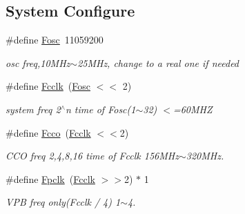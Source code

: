 \subsection*{System Configure}
\begin{DoxyCompactItemize}
\item 
\mbox{\label{group__RTEMSBSPsARMRTL22XX_gae9bb9fae1c140030037aa1eaa9470b74}} 
\#define \mbox{\hyperlink{group__RTEMSBSPsARMRTL22XX_gae9bb9fae1c140030037aa1eaa9470b74}{Fosc}}~11059200
\begin{DoxyCompactList}\small\item\em osc freq,10M\+Hz$\sim$25\+M\+Hz, change to a real one if needed \end{DoxyCompactList}\item 
\mbox{\label{group__RTEMSBSPsARMRTL22XX_ga66baa07b976e8410ffd4ba3d3d2bd8b5}} 
\#define \mbox{\hyperlink{group__RTEMSBSPsARMRTL22XX_ga66baa07b976e8410ffd4ba3d3d2bd8b5}{Fcclk}}~(\mbox{\hyperlink{group__RTEMSBSPsARMRTL22XX_gae9bb9fae1c140030037aa1eaa9470b74}{Fosc}} $<$$<$ 2)
\begin{DoxyCompactList}\small\item\em system freq 2$^\wedge$n time of Fosc(1$\sim$32) $<$=60M\+HZ \end{DoxyCompactList}\item 
\mbox{\label{group__RTEMSBSPsARMRTL22XX_ga460866a2dcef5ba8998a3db2a3c59e56}} 
\#define \mbox{\hyperlink{group__RTEMSBSPsARMRTL22XX_ga460866a2dcef5ba8998a3db2a3c59e56}{Fcco}}~(\mbox{\hyperlink{group__RTEMSBSPsARMRTL22XX_ga66baa07b976e8410ffd4ba3d3d2bd8b5}{Fcclk}} $<$$<$2)
\begin{DoxyCompactList}\small\item\em C\+CO freq 2,4,8,16 time of Fcclk 156M\+Hz$\sim$320\+M\+Hz. \end{DoxyCompactList}\item 
\mbox{\label{group__RTEMSBSPsARMRTL22XX_ga2dfa997b5d9c757ba0f8015b9e29a34b}} 
\#define \mbox{\hyperlink{group__RTEMSBSPsARMRTL22XX_ga2dfa997b5d9c757ba0f8015b9e29a34b}{Fpclk}}~(\mbox{\hyperlink{group__RTEMSBSPsARMRTL22XX_ga66baa07b976e8410ffd4ba3d3d2bd8b5}{Fcclk}} $>$$>$2) $\ast$ 1
\begin{DoxyCompactList}\small\item\em V\+PB freq only(Fcclk / 4) 1$\sim$4. \end{DoxyCompactList}\end{DoxyCompactItemize}
